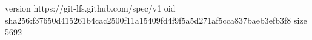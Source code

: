 version https://git-lfs.github.com/spec/v1
oid sha256:f37650d415261b4cac2500f11a15409fd4f9f5a5d271af5cca837baeb3efb3f8
size 5692
